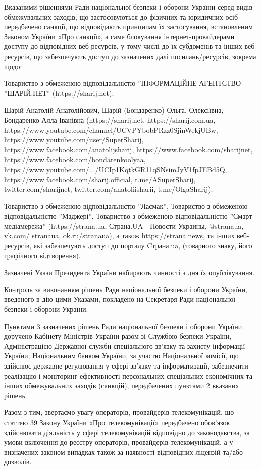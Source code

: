 Вказаними рішеннями Ради національної безпеки і оборони України серед видів
обмежувальних заходів, що застосовуються до фізичних та юридичних осіб
передбачено санкції, що відповідають принципам їх застосування, встановленим
Законом України «Про санкції», а саме блокування інтернет-провайдерами доступу
до відповідних веб-ресурсів, у тому числі до їх субдоменів та інших
веб-ресурсів, що забезпечують доступ до зазначених далі посилань/ресурсів,
зокрема щодо:

Товариство з обмеженою відповідальністю ''ІНФОРМАЦІЙНЕ АГЕНТСТВО ''ШАРІЙ.НЕТ'' (https://sharij.net);

Шарій Анатолій Анатолійович, Шарій (Бондаренко) Ольга, Олексіївна, Бондаренко
Алла Іванівна (https://sharij.net, https://sharij.com.ua,
https://www.youtube.com/channel/UCVPYbobPRzz0SjinWekjUBw,
https://www.youtube.com/user/SuperSharij,
https://www.facebook.com/anatolijsharij, https://www.facebook.com/sharijnet,
https://www.facebook.com/bondarenkoolyaa,
https://www.youtube.com/.../UCIp1KqtkGR11qSNsimJyV1fpJEBd5Q,
https://www.facebook.com/sharij.official, t.me/ASuperSharij,
twitter.com/sharijnet, twitter.com/anatoliisharii, t.me/OlgaSharij);

Товариство з обмеженою відповідальністю ''Ласмак'', Товариство з обмеженою
відповідальністю ''Маджері'', Товариство з обмеженою відповідальністю ''Смарт
медіамережа'' (https://strana.ua, Страна.UA - Новости Украины, @stranaua,
vk.com/ stranaua, ok.ru/stranaua), а також https://strana.news, та інших
веб-ресурсів, які забезпечують доступ до порталу Cтрана.ua, (товарного знаку,
його графічного відтворення).

Зазначені Укази Президента України набирають чинності з дня їх опублікування.

Контроль за виконанням рішень Ради національної безпеки і оборони України,
введеного в дію цими Указами, покладено на Секретаря Ради національної безпеки
і оборони України.

Пунктами 3 зазначених рішень Ради національної безпеки і оборони України
доручено Кабінету Міністрів України разом зі Службою безпеки України,
Адміністрацією Державної служби спеціального зв'язку та захисту інформації
України, Національним банком України, за участю Національної комісії, що
здійснює державне регулювання у сфері зв'язку та інформатизації, забезпечити
реалізацію і моніторинг ефективності персональних спеціальних економічних та
інших обмежувальних заходів (санкцій), передбачених пунктами 2 вказаних рішень.

Разом з тим, звертаємо увагу операторів, провайдерів телекомунікацій, що
статтею 39 Закону України «Про телекомунікації» передбачено обов’язок
здійснювати діяльність у сфері телекомунікацій відповідно до законодавства, за
умови включення до реєстру операторів, провайдерів телекомунікацій, а у
визначених законом випадках також за наявності відповідних ліцензій та/або
дозволів.

